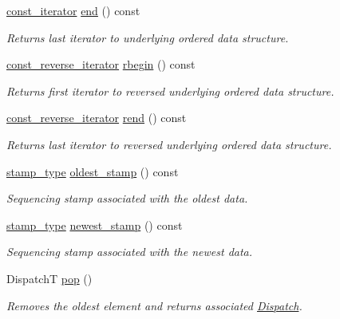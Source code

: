 \begin{DoxyCompactItemize}
\hyperlink{classflow_1_1_dispatch_queue_a307496fdc34a2d59e11114dabf85dc8a}{const\+\_\+iterator} \hyperlink{classflow_1_1_dispatch_queue_a359b294ce203e10ee9fafc147f6638ff}{end} () const
\begin{DoxyCompactList}\small\item\em Returns last iterator to underlying ordered data structure. \end{DoxyCompactList}\item 
\hyperlink{classflow_1_1_dispatch_queue_ac74f1a9a8d77b06e9576492df2a50e4f}{const\+\_\+reverse\+\_\+iterator} \hyperlink{classflow_1_1_dispatch_queue_a969fdabec571725b903056d69ea2a31b}{rbegin} () const
\begin{DoxyCompactList}\small\item\em Returns first iterator to reversed underlying ordered data structure. \end{DoxyCompactList}\item 
\hyperlink{classflow_1_1_dispatch_queue_ac74f1a9a8d77b06e9576492df2a50e4f}{const\+\_\+reverse\+\_\+iterator} \hyperlink{classflow_1_1_dispatch_queue_a5fee6900da4ddd095b78608081b1873d}{rend} () const
\begin{DoxyCompactList}\small\item\em Returns last iterator to reversed underlying ordered data structure. \end{DoxyCompactList}\item 
\hyperlink{classflow_1_1_dispatch_queue_a7908f3d78b7f1767462244b94434d748}{stamp\+\_\+type} \hyperlink{classflow_1_1_dispatch_queue_a6411ccf159a54568dc00072b35593189}{oldest\+\_\+stamp} () const
\begin{DoxyCompactList}\small\item\em Sequencing stamp associated with the oldest data. \end{DoxyCompactList}\item 
\hyperlink{classflow_1_1_dispatch_queue_a7908f3d78b7f1767462244b94434d748}{stamp\+\_\+type} \hyperlink{classflow_1_1_dispatch_queue_a5ced281bc5c221a79bf88a6169429252}{newest\+\_\+stamp} () const
\begin{DoxyCompactList}\small\item\em Sequencing stamp associated with the newest data. \end{DoxyCompactList}\item 
DispatchT \hyperlink{classflow_1_1_dispatch_queue_a10607f6122683a4e24b44daaf8bf51fe}{pop} ()
\begin{DoxyCompactList}\small\item\em Removes the oldest element and returns associated \hyperlink{classflow_1_1_dispatch}{Dispatch}. \end{DoxyCompactList}\item 

\end{DoxyCompactItemize}
